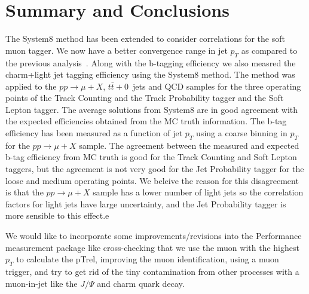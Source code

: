 \section{Summary and Conclusions}


 The System8 method has been extended to consider correlations for the soft
muon tagger. We now have a better convergence range in jet $p_T$ as compared 
to the previous analysis~\cite{ref:btag_oldnote}. Along with
the b-tagging efficiency we also measred the charm+light jet tagging 
efficiency using the System8 method. The method was applied to the 
$pp\rightarrow \mu +X$, $t\bar{t}+0$~jets and QCD samples for the three 
operating points of the Track Counting and the Track Probability tagger and the
Soft Lepton tagger. The average solutions from System8 are in good 
agreement with the expected efficiencies obtained from the MC truth information.
The b-tag efficiency has been measured as a function of jet $p_T$ using a coarse
binning in $p_T$ for the $pp\rightarrow \mu +X$ sample. The agreement between 
the measured and expected b-tag efficiency from MC truth is good for the Track 
Counting and Soft Lepton taggers, but the agreement is not very good for the 
Jet Probability tagger for the loose and medium operating points. We beleive
the reason for this disagreement is that the $pp\rightarrow \mu +X$ sample
 has a lower number of light jets so the correlation factors for 
light jets have large uncertainty, and the Jet Probability tagger is more
sensible to this effect.e

 We would like to incorporate some improvements/revisions into the Performance 
measurement package like cross-checking that we use the muon with the highest 
$p_T$ to calculate the pTrel, improving the muon identification, 
using a muon trigger, and try to get rid of the tiny contamination from other 
processes with a muon-in-jet like the $J/\Psi $ and charm quark decay.

